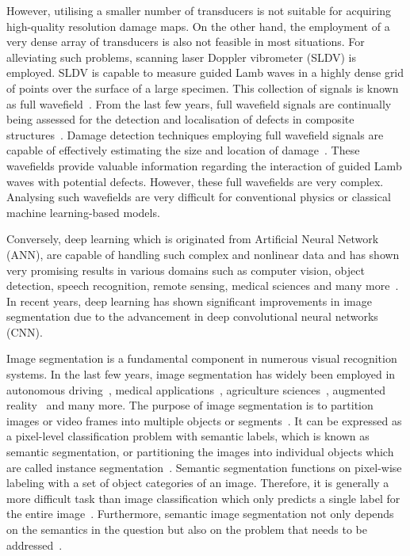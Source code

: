 However, utilising a smaller number of transducers is not suitable for acquiring high-quality resolution damage maps.
On the other hand, the employment of a very dense array of transducers is also not feasible in most situations. 
For alleviating such problems, scanning laser Doppler vibrometer (SLDV) is employed. 
SLDV is capable to measure guided Lamb waves in a highly dense grid of points over the surface of a large specimen.
This collection of signals is known as full wavefield~\cite{radzienski2019damage}. 
From the last few years, full wavefield signals are continually being assessed for the detection and localisation of defects in composite
structures~\cite{radzienski2019damage, girolamo2018impact, kudela2018impact, sohn2011delamination, sohn2011automated, rogge2013characterization}.
Damage detection techniques employing full wavefield signals are capable of effectively estimating the size and location of damage~\cite{girolamo2018impact, kudela2018impact}.
These wavefields provide valuable information regarding the interaction of guided Lamb waves with potential defects.  
However, these full wavefields are very complex. 
Analysing such wavefields are very difficult for conventional physics or classical machine learning-based models. 
 
Conversely, deep learning which is originated from Artificial Neural Network (ANN), are capable of handling such complex and nonlinear data and has shown very promising results in various domains such as computer vision, object detection, speech recognition, remote sensing, medical sciences
and many more~\cite{deng2014deep, mohanty2016using, zhang2020well, pashaei2020review}.
In recent years, deep learning has shown significant improvements in image segmentation due to the advancement in deep convolutional neural networks (CNN).

Image segmentation is a fundamental component in numerous visual recognition
systems. In the last few years, image segmentation has widely been
employed in autonomous driving~\cite{zhang2013understanding, cordts2016cityscapes, ros2016synthia, li2018real}, medical applications~\cite{taghanaki2021deep}, agriculture sciences~\cite{milioto2018real}, augmented reality~\cite{miksik2015semantic} and many more. 
The purpose of image segmentation is to partition images or video frames into multiple objects or segments~\cite{szeliski2010computer}.
It can be expressed as a pixel-level classification problem with semantic labels, which is known as semantic segmentation, or partitioning the images into individual objects which are called instance segmentation~\cite{szeliski2010computer, minaee2021image}. 
Semantic segmentation functions on pixel-wise labeling with a set of object categories of an image. 
Therefore, it is generally a more difficult task than image classification which only predicts a single label for the entire image~\cite{szeliski2010computer, minaee2021image}.
Furthermore, semantic image segmentation not only depends on the semantics in
the question but also on the problem that needs to be addressed~\cite{ghosh2019understanding}.

